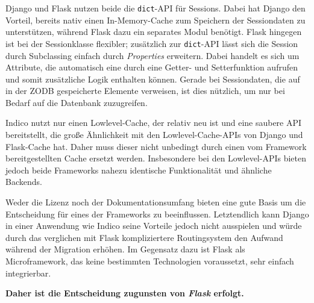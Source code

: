 Django und Flask nutzen beide die \lstinline{dict}-API für Sessions. Dabei hat Django den
Vorteil, bereits nativ einen In-Memory-Cache zum Speichern der Sessiondaten zu unterstützen, während
Flask dazu ein separates Modul benötigt. Flask hingegen ist bei der Sessionklasse flexibler;
zusätzlich zur \lstinline{dict}-API lässt sich die Session durch Subclassing einfach durch
\emph{Properties} erweitern. Dabei handelt es sich um Attribute, die automatisch eine durch eine
Getter- und Setterfunktion aufrufen und somit zusätzliche Logik enthalten können. Gerade bei
Sessiondaten, die auf in der ZODB gespeicherte Elemente verweisen, ist dies nützlich, um nur bei
Bedarf auf die Datenbank zuzugreifen.

Indico nutzt nur einen Lowlevel-Cache, der relativ neu ist und eine saubere API bereitstellt, die
große Ähnlichkeit mit den Lowlevel-Cache-APIs von Django und Flask-Cache hat. Daher muss dieser
nicht unbedingt durch einen vom Framework bereitgestellten Cache ersetzt werden. Insbesondere bei
den Lowlevel-APIs bieten jedoch beide Frameworks nahezu identische Funktionalität und ähnliche
Backends.

Weder die Lizenz noch der Dokumentationsumfang bieten eine gute Basis um die Entscheidung für eines
der Frameworks zu beeinflussen. Letztendlich kann Django in einer Anwendung wie Indico seine Vorteile
jedoch nicht ausspielen und würde durch das verglichen mit Flask kompliziertere Routingsystem den
Aufwand während der Migration erhöhen. Im Gegensatz dazu ist Flask als Microframework, das keine
bestimmten Technologien voraussetzt, sehr einfach integrierbar.

\textbf{Daher ist die Entscheidung zugunsten von \emph{Flask} erfolgt.}
